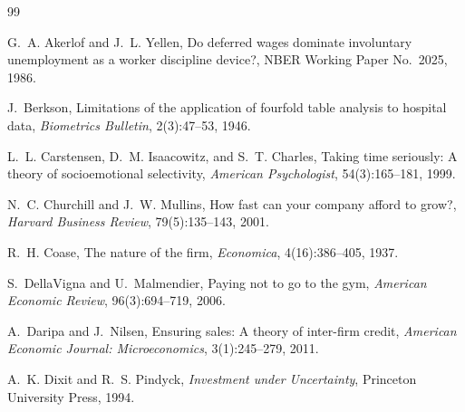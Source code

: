 \begin{thebibliography}{99}

G.~A. Akerlof and J.~L. Yellen,
\newblock Do deferred wages dominate involuntary unemployment as a worker discipline device?,
\newblock NBER Working Paper No.~2025, 1986.

J.~Berkson,
\newblock Limitations of the application of fourfold table analysis to hospital data,
\newblock \emph{Biometrics Bulletin}, 2(3):47--53, 1946.

L.~L. Carstensen, D.~M. Isaacowitz, and S.~T. Charles,
\newblock Taking time seriously: A theory of socioemotional selectivity,
\newblock \emph{American Psychologist}, 54(3):165--181, 1999.

N.~C. Churchill and J.~W. Mullins,
\newblock How fast can your company afford to grow?,
\newblock \emph{Harvard Business Review}, 79(5):135--143, 2001.

R.~H. Coase,
\newblock The nature of the firm,
\newblock \emph{Economica}, 4(16):386--405, 1937.

S.~DellaVigna and U.~Malmendier,
\newblock Paying not to go to the gym,
\newblock \emph{American Economic Review}, 96(3):694--719, 2006.

A.~Daripa and J.~Nilsen,
\newblock Ensuring sales: A theory of inter-firm credit,
\newblock \emph{American Economic Journal: Microeconomics}, 3(1):245--279, 2011.

A.~K. Dixit and R.~S. Pindyck,
\newblock \emph{Investment under Uncertainty},
\newblock Princeton University Press, 1994.


\end{thebibliography}
